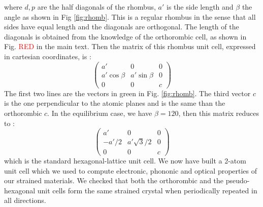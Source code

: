 where $d,p$ are the half diagonals of the rhombus, $a'$ is the side length and $\beta$ the angle as shown in Fig \ref{fig:rhomb}. This is a regular rhombus in the sense that all sides have equal length and the diagonals are orthogonal. The length of the diagonals is obtained from the knowledge of the orthorombic cell, as shown in Fig. \textcolor{red}{RED} in the main text.
Then the matrix of this rhombus unit cell, expressed in cartesian coordinates, is :
\begin{equation*}
\begin{pmatrix}
a' & 0 & 0\\
a'\cos\beta & a'\sin\beta & 0\\
0 & 0 & c
\end{pmatrix}
\end{equation*}
The first two lines are the vectors in green in Fig. \ref{fig:rhomb}. The third vector $c$ is the one perpendicular to the atomic planes and is the same than the orthorombic $c$.
In the equilibrium case, we have $\beta = 120$\textdegree, then this matrix reduces to :
\begin{equation*}
\begin{pmatrix}
a' & 0 & 0\\
-a'/2 & a'\sqrt{3}/2 & 0\\
0 & 0 & c
\end{pmatrix}
\end{equation*}
which is the standard hexagonal-lattice unit cell. We now have built a 2-atom unit cell which we used to compute electronic, phononic and optical properties of our strained materials. We checked that both the orthorombic and the pseudo-hexagonal unit cells form the same strained crystal when periodically repeated in all directions.